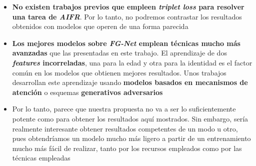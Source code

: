 \begin{itemize}
    \item \textbf{No existen trabajos previos que empleen \textit{triplet loss} para resolver una tarea de \textit{AIFR}}. Por lo tanto, no podremos contrastar los resultados obtenidos con modelos que operen de una forma parecida
    \item \textbf{Los mejores modelos sobre \textit{FG-Net} emplean técnicas mucho más avanzadas} que las presentadas en este trabajo. El aprendizaje de dos \textbf{\textit{features} incorreladas}, una para la edad y otra para la identidad es el factor común en los modelos que obtienen mejores resultados. Unos trabajos desarrollan este aprendizaje usando \textbf{modelos basados en mecanismos de atención} o esquemas \textbf{generativos adversarios}
    \item Por lo tanto, parece que nuestra propuesta no va a ser lo suficientemente potente como para obtener los resultados aquí mostrados. Sin embargo, sería realmente interesante obtener resultados competentes de un modo u otro, pues obtendríamos un modelo mucho más ligero a partir de un entrenamiento mucho más fácil de realizar, tanto por los recursos empleados como por las técnicas empleadas
\end{itemize}
